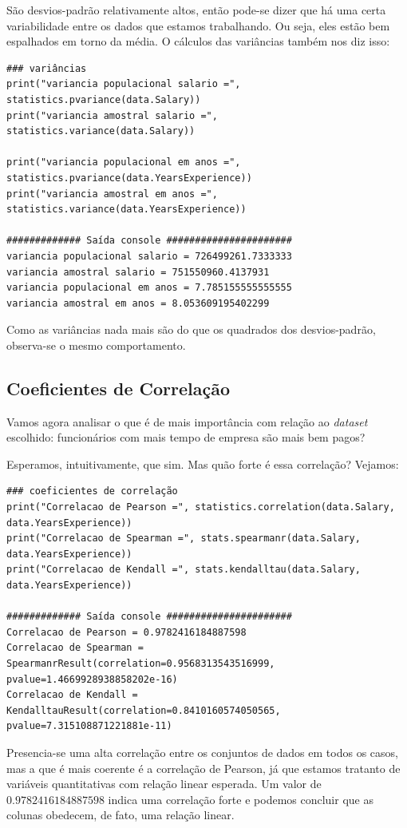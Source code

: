 \documentclass{article}
\begin{document}
São desvios-padrão relativamente altos, então pode-se dizer que há uma certa variabilidade entre os dados que estamos trabalhando. Ou seja, eles estão bem espalhados em torno da média. O cálculos das variâncias também nos diz isso:

\begin{verbatim}
### variâncias
print("variancia populacional salario =", statistics.pvariance(data.Salary))
print("variancia amostral salario =", statistics.variance(data.Salary))

print("variancia populacional em anos =", statistics.pvariance(data.YearsExperience))
print("variancia amostral em anos =", statistics.variance(data.YearsExperience))

############# Saída console ######################
variancia populacional salario = 726499261.7333333
variancia amostral salario = 751550960.4137931
variancia populacional em anos = 7.785155555555555
variancia amostral em anos = 8.053609195402299  
\end{verbatim}

Como as variâncias nada mais são do que os quadrados dos desvios-padrão, observa-se o mesmo comportamento.

\subsection{Coeficientes de Correlação}
Vamos agora analisar o que é de mais importância com relação ao {\it dataset} escolhido: funcionários com mais tempo de empresa são mais bem pagos?

Esperamos, intuitivamente, que sim. Mas quão forte é essa correlação? Vejamos:

\begin{verbatim}
### coeficientes de correlação
print("Correlacao de Pearson =", statistics.correlation(data.Salary, data.YearsExperience))
print("Correlacao de Spearman =", stats.spearmanr(data.Salary, data.YearsExperience))
print("Correlacao de Kendall =", stats.kendalltau(data.Salary, data.YearsExperience))

############# Saída console ######################
Correlacao de Pearson = 0.9782416184887598
Correlacao de Spearman = SpearmanrResult(correlation=0.9568313543516999, pvalue=1.4669928938858202e-16)
Correlacao de Kendall = KendalltauResult(correlation=0.8410160574050565, pvalue=7.315108871221881e-11) 
\end{verbatim}

Presencia-se uma alta correlação entre os conjuntos de dados em todos os casos, mas a que é mais coerente é a correlação de Pearson, já que estamos tratanto de variáveis quantitativas com relação linear esperada. Um valor de $0.9782416184887598$ indica uma correlação forte e podemos concluir que as colunas obedecem, de fato, uma relação linear.
\end{document}
